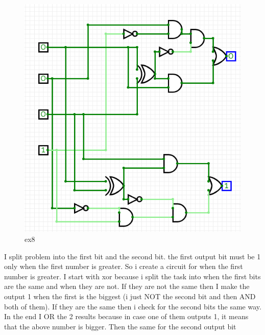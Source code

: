 \documentclass[10pt,answers]{exam}
\begin{document}
\begin{questions}
\begin{solution}
	\begin{figure}[H]
		\centering
		\includegraphics[width=\textwidth]{ex8.png}
		\caption{ex8}
    	\label{fig:ex8}
	\end{figure}
I split problem into the first bit and the second bit. the first output bit must be 1 only when the first number is greater. So i create a circuit for when the first number is greater. I start with xor because i split the task into when the first bits are the same and when they are not. If they are not the same then I make the output 1 when the first is the biggest (i just NOT the second bit and then AND both of them). If they are the same then i check for the second bits the same way. In the end I OR the 2 results because in case one of them outputs 1, it means that the above number is bigger. Then the same for the second output bit
\end{solution}



\end{questions}
\end{document}
